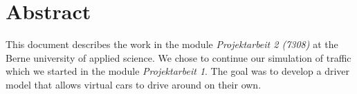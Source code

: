 
\section{Abstract}

This document describes the work in the module \emph{Projektarbeit 2 (7308)}
at the Berne university of applied science. We chose to continue our simulation
of traffic which we started in the module \emph{Projektarbeit 1}. The goal
was to develop a driver model that allows virtual cars to drive around on their own.
